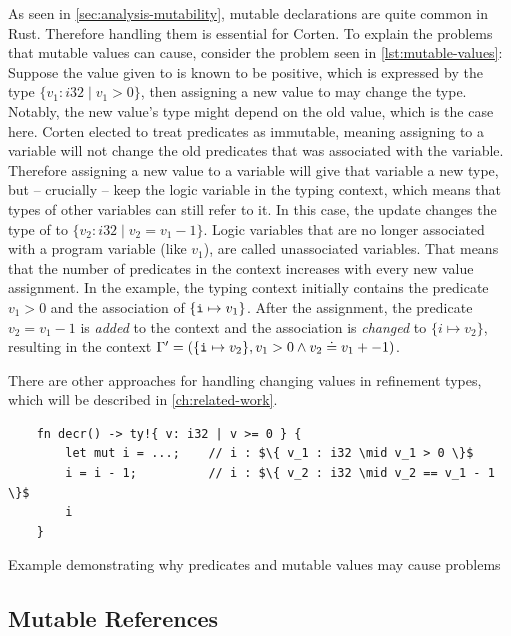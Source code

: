 \documentclass[twoside, english, final]{sdqthesis}
\theoremstyle{definition}
\begin{document}
As seen in \cref{sec:analysis-mutability}, mutable declarations are quite common in Rust. Therefore handling them is essential for Corten.
To explain the problems that mutable values can cause, consider the problem seen in \cref{lst:mutable-values}: Suppose the value given to  is known to be positive, which is expressed by the type $\{ v_1 : i32 \mid v_1 > 0\}$, then assigning a new value to  may change the type. Notably, the new value's type might depend on the old value, which is the case here.
Corten elected to treat predicates as immutable, meaning assigning to a variable will not change the old predicates that was associated with the variable.
Therefore assigning a new value to a variable will give that variable a new type, but -- crucially -- keep the logic variable in the typing context, which means that types of other variables can still refer to it. In this case, the update  changes the type of  to $\{ v_2 : i32 \mid v_2 = v_1 - 1\}$.
Logic variables that are no longer associated with a program variable (like $v_1$), are called unassociated variables.
That means that the number of predicates in the context increases with every new value assignment.
In the example, the typing context initially contains the predicate $v_1 > 0$ and the association of $\{\code{i} \mapsto v_1\}$. After the assignment, the predicate $v_2 = v_1 - 1$ is \textit{added} to the context and the association is \textit{changed} to $\{i \mapsto v_2\}$, resulting in the context $\Gamma' = (\{\code{i} \mapsto v_2\}, v_1 > 0 \wedge v_2 \doteq v_1 +-1)$.

There are other approaches for handling changing values in refinement types, which will be described in \ref{ch:related-work}.


\begin{listing}[h]
  \begin{verbatim}
    fn decr() -> ty!{ v: i32 | v >= 0 } {
        let mut i = ...;    // i : $\{ v_1 : i32 \mid v_1 > 0 \}$
        i = i - 1;          // i : $\{ v_2 : i32 \mid v_2 == v_1 - 1 \}$
        i
    }
  \end{verbatim}
  \caption{Example demonstrating why predicates and mutable values may cause problems}
  \label{lst:mutable-values}
\end{listing}

\subsection{Mutable References}\label{subsec:mutable-references}
\end{document}
